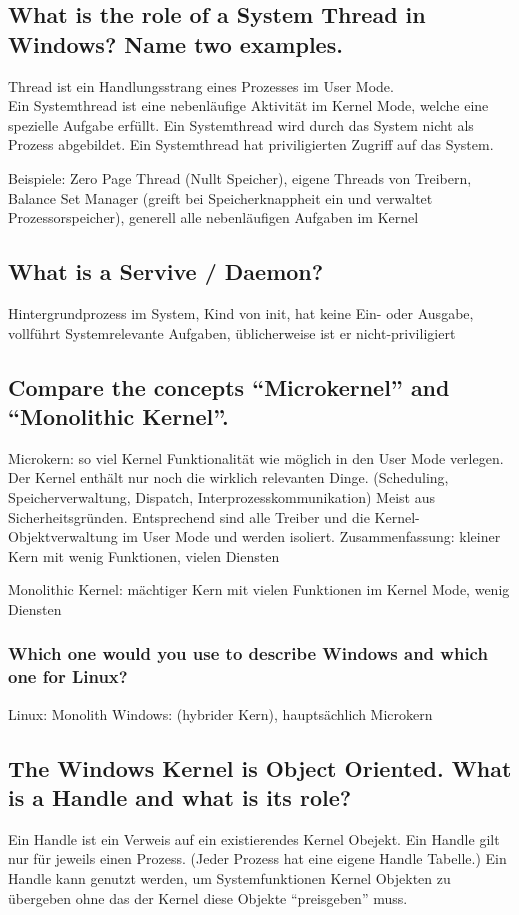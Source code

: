 \subsection{What is the role of a System Thread in Windows? Name two examples.}
Thread ist ein Handlungsstrang eines Prozesses im User Mode. \\
Ein Systemthread ist eine nebenläufige Aktivität im Kernel Mode, welche eine spezielle Aufgabe erfüllt.
Ein Systemthread wird durch das System nicht als Prozess abgebildet.
Ein Systemthread hat priviligierten Zugriff auf das System.

Beispiele: Zero Page Thread (Nullt Speicher), eigene Threads von Treibern, Balance Set Manager (greift bei Speicherknappheit ein und verwaltet Prozessorspeicher), generell alle nebenläufigen Aufgaben im Kernel

\subsection{What is a Servive / Daemon?}
Hintergrundprozess im System, Kind von init, hat keine Ein- oder Ausgabe, vollführt Systemrelevante Aufgaben, üblicherweise ist er nicht-priviligiert

\subsection{Compare the concepts ``Microkernel'' and ``Monolithic Kernel''.}
Microkern: so viel Kernel Funktionalität wie möglich in den User Mode verlegen.
Der Kernel enthält nur noch die wirklich relevanten Dinge. (Scheduling, Speicherverwaltung, Dispatch, Interprozesskommunikation)
Meist aus Sicherheitsgründen.
Entsprechend sind alle Treiber und die Kernel-Objektverwaltung im User Mode und werden isoliert.
Zusammenfassung: kleiner Kern mit wenig Funktionen, vielen Diensten

Monolithic Kernel: mächtiger Kern mit vielen Funktionen im Kernel Mode, wenig Diensten

\subsubsection{Which one would you use to describe Windows and which one for Linux?}
Linux: Monolith
Windows: (hybrider Kern), hauptsächlich Microkern

\subsection{\important The Windows Kernel is Object Oriented. What is a Handle and what is its role?}
Ein Handle ist ein Verweis auf ein existierendes Kernel Obejekt.
Ein Handle gilt nur für jeweils einen Prozess. (Jeder Prozess hat eine eigene Handle Tabelle.)
Ein Handle kann genutzt werden, um Systemfunktionen Kernel Objekten zu übergeben ohne das der Kernel diese Objekte ``preisgeben'' muss.

